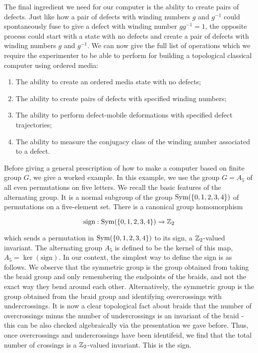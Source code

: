 The final ingredient we need for our computer is the ability to create pairs of defects. Just like how a pair of defects with winding numbers $g$ and $g^{-1}$ could spontaneously fuse to give a defect with winding number $gg^{-1}=1$, the opposite process could start with a state with no defects and create a pair of defects with winding numbers $g$ and $g^{-1}$. We can now give the full list of operations which we require the experimenter to be able to perform for building a topological classical computer using ordered media:

\begin{enumerate}
\item The ability to create an ordered media state with no defects;
\item The ability to create pairs of defects with specified winding numbers;
\item The ability to perform defect-mobile deformations with specified defect trajectories;
\item The ability to measure the conjugacy class of the winding number associated to a defect.
\end{enumerate}

Before giving a general prescription of how to make a computer based on finite group $G$, we give a worked example. In this example, we use the group $G=A_5$ of all even permutations on five letters. We recall the basic features of the alternating group. It is a normal subgroup of the group $ \operatorname{Sym}(\{0,1,2,3,4\})$ of permutations on a five-element set. There is a canonical group homomorphism

$$\text{sign}:\operatorname{Sym}(\{0,1,2,3,4\})\xrightarrow{}\mathbb{Z}_2$$

which sends a permutation in $\operatorname{Sym}(\{0,1,2,3,4\})$ to its sign, a $\mathbb{Z}_2$-valued invariant. The alternating group $A_5$ is defined to be the kernel of this map, $A_5=\ker(\text{sign})$. In our context, the simplest way to define the sign is as follows. We observe that the symmetric group is the group obtained from taking the braid group and only remembering the endpoints of the braids, and not the exact way they bend around each other. Alternatively, the symmetric group is the group obtained from the braid group and identifying overcrossings with undercrossings. It is now a clear topological fact about braids that the number of overcrossings minus the number of undercrossings is an invariant of the braid - this can be also checked algebraically via the presentation we gave before. Thus, once overcrossings and undercrossings have been identifeid, we find that the total number of crossings is a $\mathbb{Z}_2$-valued invariant. This is the sign.

